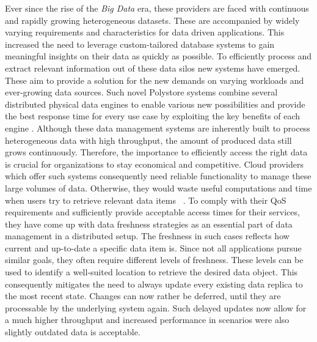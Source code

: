 Ever since the rise of the \emph{Big Data} era, these providers are faced with continuous
and rapidly growing heterogeneous datasets. These are accompanied by widely varying requirements 
and characteristics for data driven applications. This increased the need to leverage custom-tailored 
database systems to gain meaningful insights on their data as quickly as possible.
To efficiently process and extract relevant information out of these data silos new systems
have emerged. These aim to provide a solution for the new demands on varying workloads 
and ever-growing data sources.
Such novel Polystore systems combine several distributed physical data engines to enable various
new possibilities and provide the best response time for every use case by exploiting
the key benefits of each engine \cite{stonebraker:2005} \cite{polypheny2020}. Although these data management systems are inherently
built to process heterogeneous data with high throughput, the amount of produced data
still grows continuously.
Therefore, the importance to efficiently access the right data is crucial
for organizations to stay economical and competitive. Cloud providers which offer such systems consequently 
need reliable functionality to manage these large volumes of data. Otherwise, they would waste useful 
computations and time when users try to retrieve relevant data items ~\cite{levandowski2013}.
To comply with their QoS requirements and sufficiently provide acceptable access times for their services, 
they have come up with data freshness strategies as an essential part of data management in a
distributed setup. 
The freshness in such cases reflects how current and up-to-date a specific data item is.
Since not all applications pursue similar goals, they often require different levels of freshness.
These levels can be used to identify a well-suited location to retrieve the desired data object. 
This consequently mitigates the need to always update every existing data replica to the most recent state.
Changes can now rather be deferred, until they are processable by the underlying system again.
Such delayed updates now allow for a much higher throughput and increased performance in scenarios were also slightly 
outdated data is acceptable. 




